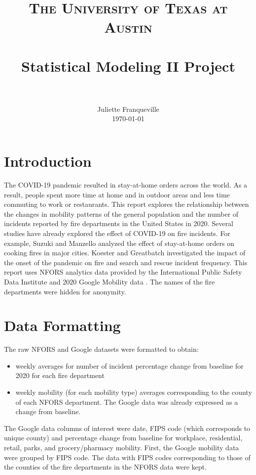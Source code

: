 \documentclass[paper=a4, fontsize=11pt]{scrartcl}
\title{
		\usefont{OT1}{bch}{b}{n}
		\normalfont \normalsize \textsc{The University of Texas at Austin} \\ [25pt]
		\horrule{0.5pt} \\[0.4cm]
		\huge Statistical Modeling II Project \\
		\horrule{2pt} \\[0.5cm]
}
\author{
		\normalfont 								\normalsize
        Juliette Franqueville\\[-3pt]		\normalsize
        \today
}
\date{}
\begin{document}
\maketitle
\newpage
\section{Introduction}

The COVID-19 pandemic resulted in stay-at-home orders across the world. As a result, people spent more time at home and in outdoor areas and less time commuting to work or restaurants. This report explores the relationship between the changes in mobility patterns of the general population and the number of incidents reported by fire departments in the United States in 2020. Several studies have already explored the effect of COVID-19 on fire incidents. For example, Suzuki and Manzello \cite{fire_paper} analyzed the effect of stay-at-home orders on cooking fires in major cities. Koester and Greatbatch \cite{koester2020comparing} investigated the impact of the onset of the pandemic on fire and search and rescue incident frequency. This report uses NFORS \cite{nfors} analytics data provided by the International Public Safety Data Institute and 2020 Google Mobility data \cite{google}. The names of the fire departments were hidden for anonymity. 

\section{Data Formatting}
The raw NFORS and Google datasets were formatted to obtain:
\begin{itemize}[noitemsep]
    \item weekly averages for number of incident percentage change from baseline for 2020 for each fire department
    \item  weekly mobility (for each mobility type) averages corresponding to the county of each NFORS department. The Google data was already expressed as a change from baseline.
\end{itemize}




The Google data columns of interest were date,  FIPS code (which corresponds to unique county) and percentage change from baseline for workplace, residential, retail, parks, and grocery/pharmacy mobility. First, the Google mobility data were grouped by FIPS code.  The data with FIPS codes corresponding to those of the counties of the fire departments in the NFORS data were kept.\\
\end{document}
